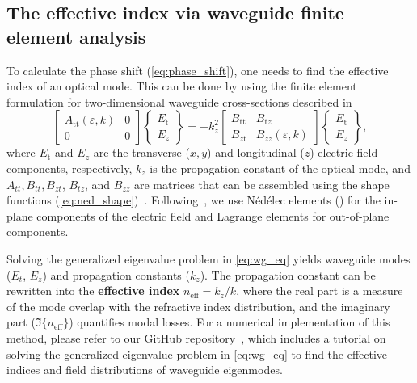 \subsection*{The effective index via waveguide finite element analysis}

To calculate the phase shift (\eqref{eq:phase_shift}), one needs to find the effective index of an optical mode. This can be done by 
using the finite element formulation for two-dimensional waveguide cross-sections described in~\cite{jin}
\begin{equation}\label{eq:wg_eq}
 \left[\begin{array}{cc}
 A_{\text{tt}}(\varepsilon,k) & 0 \\
    0 & 0
    \end{array}\right]
 \left\{\begin{array}{l}
 E_{\text{t}} \\
 E_z
    \end{array}\right\}
 = -k_z^2
 \left[\begin{array}{cc}
 B_{\text{tt}} & B_{\text{t} z} \\
 B_{z \text{t}} & B_{z z}(\varepsilon,k)
    \end{array}\right]
 \left\{\begin{array}{c}
 E_{\text{t}} \\
 E_z
    \end{array}\right\},
    \end{equation}
where $E_{\text{t}}$ and $E_z$ are the transverse ($x,y$) and longitudinal ($z$) electric field components, respectively, $k_z$ is the propagation constant of the optical mode, and $A_{tt}, B_{tt},
B_{zt}$, $B_{tz}$, and $B_{zz}$ are matrices that can be assembled using the shape functions (\eqref{eq:ned_shape})~\cite{jin}. Following~\cite{jin}, we use Nédélec elements () for the in-plane components of the electric field and 
Lagrange elements for out-of-plane components. 

Solving the generalized eigenvalue problem in \eqref{eq:wg_eq} yields waveguide modes ($E_t$, $E_z$) and propagation constants ($k_z$). The propagation constant can be rewritten into the \textbf{effective index} $n_\text{eff} = k_z / k$,
 where the real part is a measure of the mode overlap with the refractive index distribution, and the imaginary part ($\Im\{n_\text{eff}\}$) quantifies modal losses. For a numerical implementation of this method, please refer to our GitHub repository~\cite{FEWEC}, which includes a tutorial on solving the 
 generalized eigenvalue problem in \eqref{eq:wg_eq} to find the effective indices and field distributions of waveguide eigenmodes.

